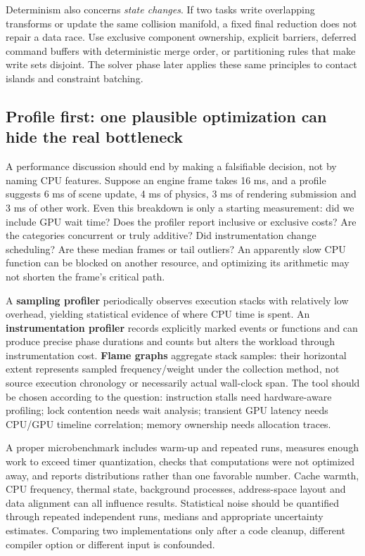 Determinism also concerns \emph{state changes}. If two tasks write overlapping transforms or update the same collision manifold, a fixed final reduction does not repair a data race. Use exclusive component ownership, explicit barriers, deferred command buffers with deterministic merge order, or partitioning rules that make write sets disjoint. The solver phase later applies these same principles to contact islands and constraint batching.

\subsection{Profile first: one plausible optimization can hide the real bottleneck}\label{01-foundations-i-ch007-profile-first-one-plausible-optimization-can-hide-the-real-bottleneck}

A performance discussion should end by making a falsifiable decision, not by naming CPU features. Suppose an engine frame takes 16 ms, and a profile suggests 6 ms of scene update, 4 ms of physics, 3 ms of rendering submission and 3 ms of other work. Even this breakdown is only a starting measurement: did we include GPU wait time? Does the profiler report inclusive or exclusive costs? Are the categories concurrent or truly additive? Did instrumentation change scheduling? Are these median frames or tail outliers? An apparently slow CPU function can be blocked on another resource, and optimizing its arithmetic may not shorten the frame's critical path.

A \textbf{sampling profiler} periodically observes execution stacks with relatively low overhead, yielding statistical evidence of where CPU time is spent. An \textbf{instrumentation profiler} records explicitly marked events or functions and can produce precise phase durations and counts but alters the workload through instrumentation cost. \textbf{Flame graphs} aggregate stack samples: their horizontal extent represents sampled frequency/weight under the collection method, not source execution chronology or necessarily actual wall-clock span. The tool should be chosen according to the question: instruction stalls need hardware-aware profiling; lock contention needs wait analysis; transient GPU latency needs CPU/GPU timeline correlation; memory ownership needs allocation traces.

A proper microbenchmark includes warm-up and repeated runs, measures enough work to exceed timer quantization, checks that computations were not optimized away, and reports distributions rather than one favorable number. Cache warmth, CPU frequency, thermal state, background processes, address-space layout and data alignment can all influence results. Statistical noise should be quantified through repeated independent runs, medians and appropriate uncertainty estimates. Comparing two implementations only after a code cleanup, different compiler option or different input is confounded.

